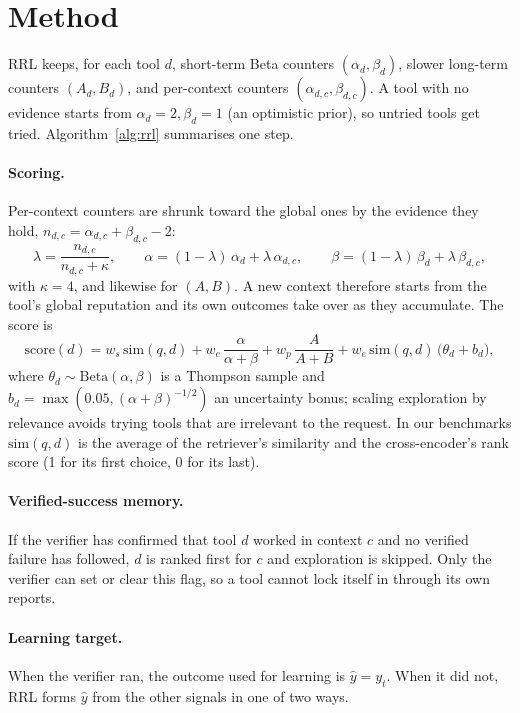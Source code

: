\documentclass[11pt]{article}
\begin{document}
\section{Method}

RRL keeps, for each tool $d$, short-term Beta counters $(\alpha_d,\beta_d)$, slower long-term
counters $(A_d,B_d)$, and per-context counters $(\alpha_{d,c},\beta_{d,c})$. A tool with no
evidence starts from $\alpha_d=2,\beta_d=1$ (an optimistic prior), so untried tools get tried.
Algorithm~\ref{alg:rrl} summarises one step.

\paragraph{Scoring.} Per-context counters are shrunk toward the global ones by the evidence they
hold, $n_{d,c}=\alpha_{d,c}+\beta_{d,c}-2$:
\begin{equation}
  \lambda = \frac{n_{d,c}}{n_{d,c}+\kappa},\qquad
  \alpha = (1-\lambda)\,\alpha_d + \lambda\,\alpha_{d,c},\qquad
  \beta = (1-\lambda)\,\beta_d + \lambda\,\beta_{d,c},
\end{equation}
with $\kappa=4$, and likewise for $(A,B)$. A new context therefore starts from the tool's global
reputation and its own outcomes take over as they accumulate. The score is
\begin{equation}
  \mathrm{score}(d) = w_s\,\mathrm{sim}(q,d) + w_c\,\frac{\alpha}{\alpha+\beta}
  + w_p\,\frac{A}{A+B} + w_e\,\mathrm{sim}(q,d)\,\bigl(\theta_d + b_d\bigr),
\end{equation}
where $\theta_d\sim\mathrm{Beta}(\alpha,\beta)$ is a Thompson sample and
$b_d=\max(0.05,(\alpha+\beta)^{-1/2})$ an uncertainty bonus; scaling exploration by relevance
avoids trying tools that are irrelevant to the request. In our benchmarks
$\mathrm{sim}(q,d)$ is the average of the retriever's similarity and the cross-encoder's rank
score (1 for its first choice, 0 for its last).

\paragraph{Verified-success memory.} If the verifier has confirmed that tool $d$ worked in
context $c$ and no verified failure has followed, $d$ is ranked first for $c$ and exploration is
skipped. Only the verifier can set or clear this flag, so a tool cannot lock itself in through
its own reports.

\paragraph{Learning target.} When the verifier ran, the outcome used for learning is $\hat y=y_t$.
When it did not, RRL forms $\hat y$ from the other signals in one of two ways.
\end{document}
